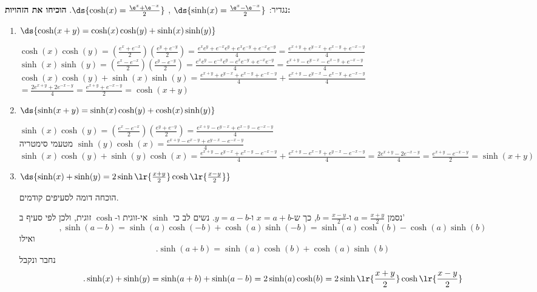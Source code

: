 נגדיר: $\ds{\sinh(x)=\frac{\e^x-\e^{-x}}{2}}$ , $\ds{\cosh(x)=\frac{\e^x+\e^{-x}}{2}}$.
\textbf{הוכיחו את הזהויות:}
\begin{enumerate}
\item $\ds{\cosh(x+y)=\cosh(x)\cosh(y)+\sinh(x)\sinh(y)}$
\begin{solbox}
$\cosh(x)\cosh(y)=(\frac{e^x+e^{-x}}{2})(\frac{e^y+e^{-y}}{2})=\frac{e^xe^{y}+e^{-x}e^{y}+e^xe^{-y}+e^{-x}e^{-y}}{4}=\frac{e^{x+y}+e^{y-x}+e^{x-y}+e^{-x-y}}{4}$
\\

$\sinh(x)\sinh(y)=(\frac{e^x-e^{-x}}{2})(\frac{e^y-e^{-y}}{2})=\frac{e^xe^{y}-e^{-x}e^{y}-e^xe^{-y}+e^{-x}e^{-y}}{4}=\frac{e^{x+y}-e^{y-x}-e^{x-y}+e^{-x-y}}{4}$
\\
$\cosh(x)\cosh(y)+\sinh(x)\sinh(y)=\frac{e^{x+y}+e^{y-x}+e^{x-y}+e^{-x-y}}{4}+\frac{e^{x+y}-e^{y-x}-e^{x-y}+e^{-x-y}}{4}$
\\
$=\frac{2e^{x+y}+2e^{-x-y}}{4}=\frac{e^{x+y}+e^{-x-y}}{2}=\cosh(x+y)$
\end{solbox}
\item $\ds{\sinh(x+y)=\sinh(x)\cosh(y)+\cosh(x)\sinh(y)}$
\begin{solbox}
$\sinh(x)\cosh(y)=(\frac{e^x-e^{-x}}{2})(\frac{e^y+e^{-y}}{2})=\frac{e^{x+y}-e^{y-x}+e^{x-y}-e^{-x-y}}{4}$
\\

מטעמי סימטריה
$\sinh(y)\cosh(x)=\frac{e^{x+y}-e^{x-y}+e^{y-x}-e^{-x-y}}{4}$
\\
$\sinh(x)\cosh(y)+\sinh(y)\cosh(x)=\frac{e^{x+y}-e^{y-x}+e^{x-y}-e^{-x-y}}{4}+\frac{e^{x+y}-e^{x-y}+e^{y-x}-e^{-x-y}}{4}=\frac{2e^{x+y}-2e^{-x-y}}{4}=\frac{e^{x+y}-e^{-x-y}}{2}=\sinh(x+y)$
\end{solbox}
\item $\ds{\sinh(x)+\sinh(y)=2\sinh\lr{\frac{x+y}{2}}\cosh\lr{\frac{x-y}{2}}}$
\begin{solbox}
הוכחה דומה לסעיפים קודמים.
\end{solbox}
\begin{solbox}
\unverified
נסמן
$a=\frac{x+y}{2}$
ו-$b=\frac{x-y}{2}$,
כך ש-$x=a+b$
ו-$y=a-b$.
נשים לב כי
$\sinh$
אי-זוגית ו-$\cosh$
זוגית, ולכן לפי סעיף ב'
$$,\sinh(a-b)=\sinh(a)\cosh(-b)+\cosh(a)\sinh(-b)=\sinh(a)\cosh(b)-\cosh(a)\sinh(b)$$
ואילו
$$.\sinh(a+b)=\sinh(a)\cosh(b)+\cosh(a)\sinh(b)$$
נחבר ונקבל
$$.\sinh(x)+\sinh(y)=\sinh(a+b)+\sinh(a-b)=2\sinh(a)\cosh(b)=2\sinh\lr{\frac{x+y}{2}}\cosh\lr{\frac{x-y}{2}}$$
\end{solbox}
\end{enumerate}

